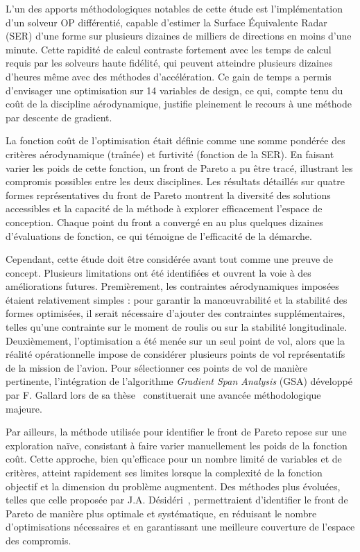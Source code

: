 L'un des apports méthodologiques notables de cette étude est l'implémentation d'un solveur OP différentié, capable d'estimer la Surface Équivalente Radar (SER) d'une forme sur plusieurs dizaines de milliers de directions en moins d'une minute. Cette rapidité de calcul contraste fortement avec les temps de calcul requis par les solveurs haute fidélité, qui peuvent atteindre plusieurs dizaines d'heures même avec des méthodes d'accélération. Ce gain de temps a permis d'envisager une optimisation sur 14 variables de design, ce qui, compte tenu du coût de la discipline aérodynamique, justifie pleinement le recours à une méthode par descente de gradient.

La fonction coût de l'optimisation était définie comme une somme pondérée des critères aérodynamique (traînée) et furtivité (fonction de la SER). En faisant varier les poids de cette fonction, un front de Pareto a pu être tracé, illustrant les compromis possibles entre les deux disciplines. Les résultats détaillés sur quatre formes représentatives du front de Pareto montrent la diversité des solutions accessibles et la capacité de la méthode à explorer efficacement l'espace de conception. Chaque point du front a convergé en au plus quelques dizaines d'évaluations de fonction, ce qui témoigne de l'efficacité de la démarche.

Cependant, cette étude doit être considérée avant tout comme une preuve de concept. Plusieurs limitations ont été identifiées et ouvrent la voie à des améliorations futures. Premièrement, les contraintes aérodynamiques imposées étaient relativement simples : pour garantir la manœuvrabilité et la stabilité des formes optimisées, il serait nécessaire d'ajouter des contraintes supplémentaires, telles qu'une contrainte sur le moment de roulis ou sur la stabilité longitudinale. Deuxièmement, l'optimisation a été menée sur un seul point de vol, alors que la réalité opérationnelle impose de considérer plusieurs points de vol représentatifs de la mission de l'avion. Pour sélectionner ces points de vol de manière pertinente, l'intégration de l'algorithme \textit{Gradient Span Analysis} (GSA) développé par F. Gallard lors de sa thèse~\citep{Gallard2014} constituerait une avancée méthodologique majeure.

Par ailleurs, la méthode utilisée pour identifier le front de Pareto repose sur une exploration naïve, consistant à faire varier manuellement les poids de la fonction coût. Cette approche, bien qu'efficace pour un nombre limité de variables et de critères, atteint rapidement ses limites lorsque la complexité de la fonction objectif et la dimension du problème augmentent. Des méthodes plus évoluées, telles que celle proposée par J.A. Désidéri~\citep{Desideri2012}, permettraient d'identifier le front de Pareto de manière plus optimale et systématique, en réduisant le nombre d'optimisations nécessaires et en garantissant une meilleure couverture de l'espace des compromis.

